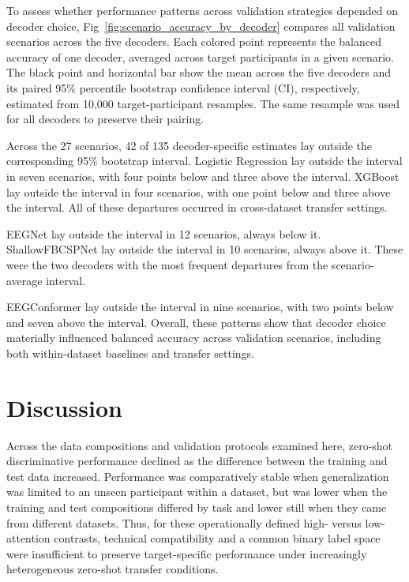 \documentclass[10pt,letterpaper]{article}
\begin{document}
To assess whether performance patterns across validation strategies depended on
decoder choice, Fig~\ref{fig:scenario_accuracy_by_decoder} compares all
validation scenarios across the five decoders. Each colored point represents
the balanced accuracy of one decoder, averaged across target participants in a
given scenario. The black point and horizontal bar show the mean
across the five decoders and its paired 95\% percentile bootstrap confidence
interval (CI), respectively, estimated from 10,000 target-participant
resamples. The same resample was used for all decoders to preserve their
pairing.



Across the 27 scenarios, 42 of 135 decoder-specific estimates lay outside the
corresponding 95\% bootstrap interval. Logistic Regression lay outside the
interval in seven scenarios, with four points below and three above the
interval. XGBoost lay outside the interval in four scenarios, with one point
below and three above the interval. All of these departures occurred in
cross-dataset transfer settings.

EEGNet lay outside the interval in 12 scenarios, always below it.
ShallowFBCSPNet lay outside the interval in 10 scenarios, always above it.
These were the two decoders with the most frequent departures from the
scenario-average interval.

EEGConformer lay outside the interval in nine scenarios, with two points below
and seven above the interval. Overall, these patterns show that decoder choice
materially influenced balanced accuracy across validation scenarios, including
both within-dataset baselines and transfer settings.

\section*{Discussion}

Across the data compositions and validation protocols examined here, zero-shot
discriminative performance declined as the difference between the training and
test data increased. Performance was comparatively stable when generalization
was limited to an unseen participant within a dataset, but was lower when the
training and test compositions differed by task and lower still when they came
from different datasets. Thus, for these operationally defined high- versus
low-attention contrasts, technical compatibility and a common binary label space
were insufficient to preserve target-specific performance under increasingly
heterogeneous zero-shot transfer conditions.
\end{document}
